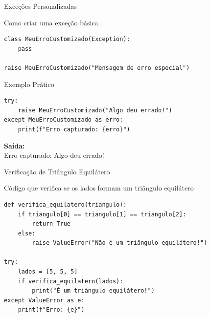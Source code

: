 \begin{frame}[fragile]{Exceções Personalizadas}
    \begin{block}{Como criar uma exceção básica}
        \begin{verbatim}
class MeuErroCustomizado(Exception):
    pass

raise MeuErroCustomizado("Mensagem de erro especial")
\end{verbatim}
    \end{block}

    \begin{exampleblock}{Exemplo Prático}
        \begin{verbatim}
try:
    raise MeuErroCustomizado("Algo deu errado!")
except MeuErroCustomizado as erro:
    print(f"Erro capturado: {erro}")
\end{verbatim}

        \small
        \textbf{Saída:}\\
        \ttfamily
        Erro capturado: Algo deu errado!
    \end{exampleblock}

\end{frame}



\begin{frame}[fragile]{Verificação de Triângulo Equilátero}
    \begin{block}{Código que verifica se os lados formam um triângulo equilátero}
        \begin{verbatim}
def verifica_equilatero(triangulo):
    if triangulo[0] == triangulo[1] == triangulo[2]:
        return True
    else:
        raise ValueError("Não é um triângulo equilátero!")

try:
    lados = [5, 5, 5]  
    if verifica_equilatero(lados):
        print("É um triângulo equilátero!")
except ValueError as e:
    print(f"Erro: {e}")
\end{verbatim}
    \end{block}
\end{frame}


